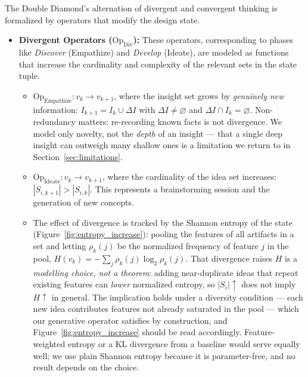 \documentclass[11pt]{article}
\newcommand{\Op}[1]{\mathrm{Op}_{\mathrm{#1}}}
\begin{document}
The Double Diamond's alternation of divergent and convergent thinking is formalized by operators that modify the design state.

\begin{itemize}
    \item \textbf{Divergent Operators ($\Op{Div}$):} These operators, corresponding to phases like \textit{Discover} (Empathize) and \textit{Develop} (Ideate), are modeled as functions that increase the cardinality and complexity of the relevant sets in the state tuple.
    \begin{itemize}
        \item $\Op{Empathize}: v_k \rightarrow v_{k+1}$, where the insight set grows by \emph{genuinely new} information: $I_{k+1}=I_k\cup\Delta I$ with $\Delta I\neq\varnothing$ and $\Delta I\cap I_k=\varnothing$. Non-redundancy matters: re-recording known facts is not divergence. We model only novelty, not the \emph{depth} of an insight --- that a single deep insight can outweigh many shallow ones is a limitation we return to in Section~\ref{sec:limitations}.
        \item $\Op{Ideate}: v_k \rightarrow v_{k+1}$, where the cardinality of the idea set increases: $|S_{i,k+1}| > |S_{i,k}|$. This represents a brainstorming session and the generation of new concepts.
        \item The effect of divergence is tracked by the Shannon entropy of the state (Figure~\ref{fig:entropy_increase}): pooling the features of all artifacts in a set and letting $\rho_k(j)$ be the normalized frequency of feature $j$ in the pool, $H(v_k)=-\sum_j\rho_k(j)\log_2\rho_k(j)$. That divergence raises $H$ is a \emph{modelling choice, not a theorem}: adding near-duplicate ideas that repeat existing features can \emph{lower} normalized entropy, so $|S_i|\!\uparrow$ does not imply $H\!\uparrow$ in general. The implication holds under a diversity condition --- each new idea contributes features not already saturated in the pool --- which our generative operator satisfies by construction, and Figure~\ref{fig:entropy_increase} should be read accordingly. Feature-weighted entropy or a KL divergence from a baseline would serve equally well; we use plain Shannon entropy because it is parameter-free, and no result depends on the choice.
    \end{itemize}






\end{itemize}
\end{document}
